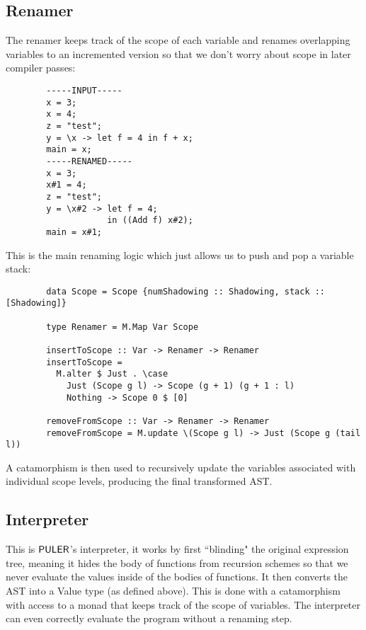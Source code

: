     \subsection{Renamer}\label{renamer}
    The renamer keeps track of the scope of each variable and renames overlapping variables to an incremented version so that we don't worry about scope in later compiler passes:
    \begin{verbatim}
        -----INPUT-----
        x = 3;
        x = 4;
        z = "test";
        y = \x -> let f = 4 in f + x;
        main = x;
        -----RENAMED-----
        x = 3;
        x#1 = 4;
        z = "test";
        y = \x#2 -> let f = 4;
                    in ((Add f) x#2);
        main = x#1;
    \end{verbatim}
    
    This is the main renaming logic which just allows us to push and pop a variable stack:
    \begin{verbatim}
        data Scope = Scope {numShadowing :: Shadowing, stack :: [Shadowing]}
        
        type Renamer = M.Map Var Scope
        
        insertToScope :: Var -> Renamer -> Renamer
        insertToScope =
          M.alter $ Just . \case
            Just (Scope g l) -> Scope (g + 1) (g + 1 : l)
            Nothing -> Scope 0 $ [0]
        
        removeFromScope :: Var -> Renamer -> Renamer
        removeFromScope = M.update \(Scope g l) -> Just (Scope g (tail l))
    \end{verbatim}
    A catamorphism is then used to recursively update the variables associated with individual scope levels, producing the final transformed AST.
    
    \subsection{Interpreter}\label{interpreter}
    This is $\mathsf{PULER}$'s interpreter, it works by first ``blinding" the original expression tree, meaning it hides the body of functions from recursion schemes so that we never evaluate the values inside of the bodies of functions. It then converts the AST into a Value type (as defined above).
    This is done with a catamorphism with access to a monad that keeps track of the scope of variables. The interpreter can even correctly evaluate the program without a renaming step.
